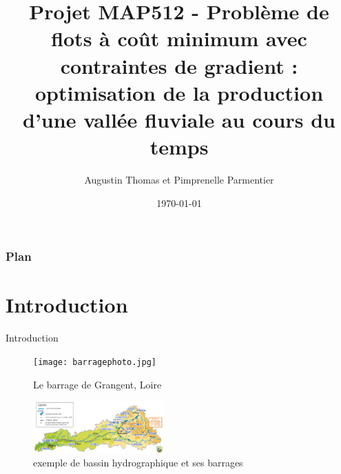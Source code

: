 \documentclass{beamer}
\title{Projet MAP512 - Problème de flots à coût minimum avec contraintes de gradient : optimisation de la production d'une vallée fluviale au cours du temps} %
\author{Augustin Thomas et Pimprenelle Parmentier} %
\date{\today} %
\begin{document}
\begin{frame}
\titlepage %
\insertframenumber\end{frame}

\begin{frame}
\frametitle{Plan} %
\tableofcontents %
\insertframenumber\end{frame}



\section{Introduction} %

\begin{frame}{Introduction}

\begin{figure}[H]
    \begin{minipage}[c]{.46\linewidth}
        \texttt{[image: barragephoto.jpg]}
        \caption{Le barrage de Grangent, Loire}
        \label{fig:simplexe}
    \end{minipage} \hfill
    \begin{minipage}[c]{.46\linewidth}
        \includegraphics[width=5cm]{carto_hydroelec_Lot.png}
        \caption{exemple de bassin hydrographique et ses barrages}
        \label{carto}
    \end{minipage}
\end{figure}

\insertframenumber
\end{frame}
\end{document}
